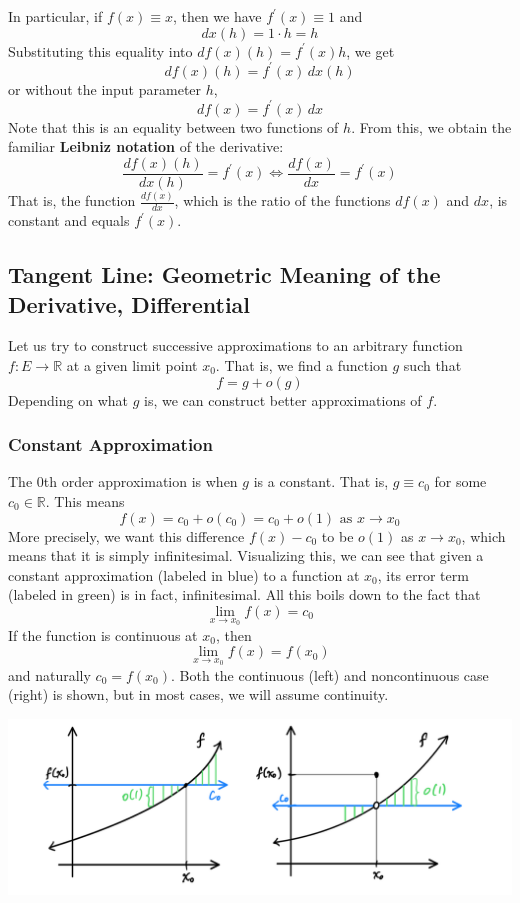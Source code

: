 \documentclass{article}
\begin{document}
    In particular, if $f(x) \equiv x$, then we have $f^\prime (x) \equiv 1$ and 
    \[dx (h) = 1 \cdot h = h\]
    Substituting this equality into $df(x) (h) = f^\prime (x) h$, we get
    \[df (x) (h) = f^\prime (x) \,dx (h)\]
    or without the input parameter $h$, 
    \[df(x) = f^\prime (x) \,dx\]
    Note that this is an equality between two functions of $h$. From this, we obtain the familiar \textbf{Leibniz notation} of the derivative: 
    \[\frac{df (x) (h)}{dx(h)} = f^\prime (x) \iff \frac{df(x)}{dx} = f^\prime (x)\]
    That is, the function $\frac{df(x)}{dx}$, which is the ratio of the functions $df(x)$ and $dx$, is constant and equals $f^\prime (x)$. 

  \subsection{Tangent Line: Geometric Meaning of the Derivative, Differential}

    Let us try to construct successive approximations to an arbitrary function $f: E \longrightarrow \mathbb{R}$ at a given limit point $x_0$. That is, we find a function $g$ such that
    \[f = g + o(g)\]
    Depending on what $g$ is, we can construct better approximations of $f$. 

    \subsubsection{Constant Approximation}
    The 0th order approximation is when $g$ is a constant. That is, $g \equiv c_0$ for some $c_0 \in \mathbb{R}$. This means
    \[f(x) = c_0 + o(c_0) = c_0 + o(1) \text{ as } x \rightarrow x_0\]
    More precisely, we want this difference $f(x) - c_0$ to be $o(1)$ as $x \rightarrow x_0$, which means that it is simply infinitesimal. Visualizing this, we can see that given a constant approximation (labeled in blue) to a function at $x_0$, its error term (labeled in green) is in fact, infinitesimal. All this boils down to the fact that 
    \[\lim_{x \rightarrow x_0} f(x) = c_0\]
    If the function is continuous at $x_0$, then 
    \[\lim_{x \rightarrow x_0} f(x) = f(x_0)\]
    and naturally $c_0 = f(x_0)$. Both the continuous (left) and noncontinuous case (right) is shown, but in most cases, we will assume continuity. 
    \begin{center}
        \includegraphics[scale=0.3]{img/Constant_Approximation_Continuous_Noncontinuous_case.PNG}
    \end{center}
\end{document}

